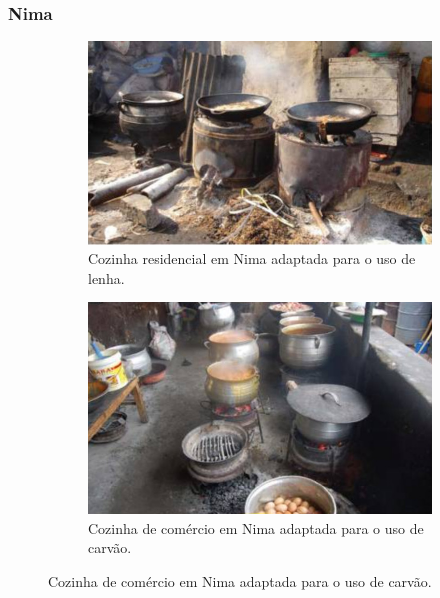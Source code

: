 \begin{frame}
	\frametitle{Nima}
	\begin{figure}[H]
		\centering
		\begin{subfigure}[b]{0.4\linewidth}
			\includegraphics[width=\linewidth]{../../inputs/images/zheng/arku1.jpeg}
			\caption{Cozinha residencial em Nima adaptada para o uso de lenha.}
		\end{subfigure}%
		\hspace{0.5cm}
		\begin{subfigure}[b]{0.4\linewidth}
			\includegraphics[width=\linewidth]{../../inputs/images/zheng/arku2.jpeg}
			\caption{Cozinha de comércio em Nima adaptada para o uso de carvão.}
		\end{subfigure}
	\end{figure}
\end{frame}

